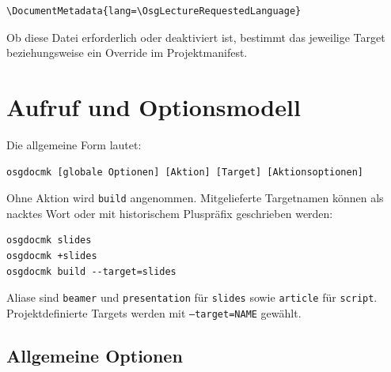 \documentclass[
load-preamble+
]{osgdoc}
\begin{document}
\begin{verbatim}
\DocumentMetadata{lang=\OsgLectureRequestedLanguage}
\end{verbatim}

Ob diese Datei erforderlich oder deaktiviert ist, bestimmt das jeweilige
Target beziehungsweise ein Override im Projektmanifest.

\section{Aufruf und Optionsmodell}

Die allgemeine Form lautet:

\begin{verbatim}
osgdocmk [globale Optionen] [Aktion] [Target] [Aktionsoptionen]
\end{verbatim}

Ohne Aktion wird \texttt{build} angenommen. Mitgelieferte Targetnamen können
als nacktes Wort oder mit historischem Pluspräfix geschrieben werden:

\begin{verbatim}
osgdocmk slides
osgdocmk +slides
osgdocmk build --target=slides
\end{verbatim}

Aliase sind \texttt{beamer} und \texttt{presentation} für \texttt{slides}
sowie \texttt{article} für \texttt{script}. Projektdefinierte Targets werden
mit \texttt{--target=NAME} gewählt.

\subsection{Allgemeine Optionen}
\end{document}
